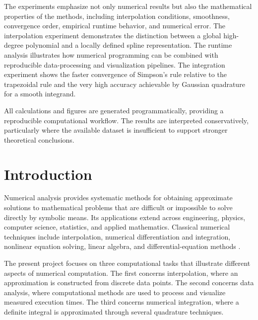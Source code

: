 \documentclass[11pt,a4paper]{article}
\begin{document}
The experiments emphasize not only numerical results but also the
mathematical properties of the methods, including interpolation conditions,
smoothness, convergence order, empirical runtime behavior, and numerical
error. The interpolation experiment demonstrates the distinction between a
global high-degree polynomial and a locally defined spline representation.
The runtime analysis illustrates how numerical programming can be combined
with reproducible data-processing and visualization pipelines. The
integration experiment shows the faster convergence of Simpson's rule
relative to the trapezoidal rule and the very high accuracy achievable by
Gaussian quadrature for a smooth integrand.

All calculations and figures are generated programmatically, providing a
reproducible computational workflow. The results are interpreted
conservatively, particularly where the available dataset is insufficient
to support stronger theoretical conclusions.

\newpage

\tableofcontents

\newpage

\listoffigures

\newpage

\listoftables

\newpage



\section{Introduction}

Numerical analysis provides systematic methods for obtaining approximate
solutions to mathematical problems that are difficult or impossible to
solve directly by symbolic means. Its applications extend across
engineering, physics, computer science, statistics, and applied
mathematics. Classical numerical techniques include interpolation,
numerical differentiation and integration, nonlinear equation solving,
linear algebra, and differential-equation methods
\cite{burden2010,chapra2015}.

The present project focuses on three computational tasks that illustrate
different aspects of numerical computation. The first concerns
interpolation, where an approximation is constructed from discrete data
points. The second concerns data analysis, where computational methods are
used to process and visualize measured execution times. The third concerns
numerical integration, where a definite integral is approximated through
several quadrature techniques.
\end{document}
